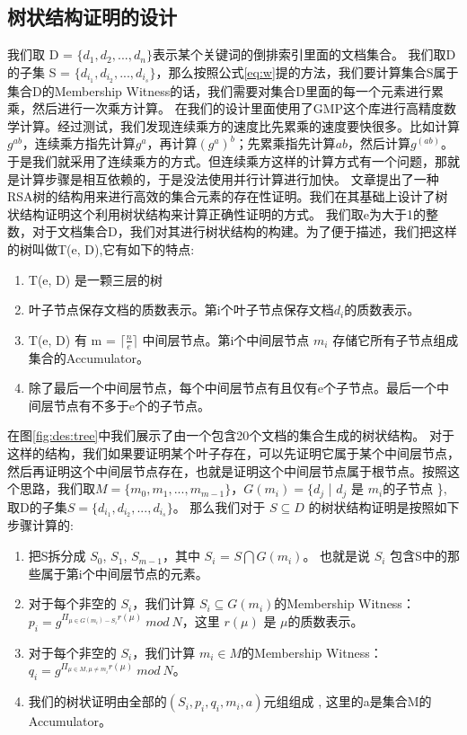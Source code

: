 \subsection{树状结构证明的设计}

我们取 D = $\{d_1, d_2, ..., d_n\}$表示某个关键词的倒排索引里面的文档集合。
我们取D的子集 S = $\{d_{i_1}, d_{i_2}, ..., d_{i_s}\}$，那么按照公式\ref{eq:w}提的方法，我们要计算集合S属于集合D的Membership Witness的话，我们需要对集合D里面的每一个元素进行累乘，然后进行一次乘方计算。
在我们的设计里面使用了GMP这个库进行高精度数学计算。经过测试，我们发现连续乘方的速度比先累乘的速度要快很多。比如计算$g^{ab}$，连续乘方指先计算$g^a$，再计算$(g^a)^b$；先累乘指先计算$ab$，然后计算$g^{(ab)}$。于是我们就采用了连续乘方的方式。但连续乘方这样的计算方式有一个问题，那就是计算步骤是相互依赖的，于是没法使用并行计算进行加快。
文章\cite{papamanthou2008authenticated}提出了一种RSA树的结构用来进行高效的集合元素的存在性证明。我们在其基础上设计了树状结构证明这个利用树状结构来计算正确性证明的方式。
我们取e为大于1的整数，对于文档集合D，我们对其进行树状结构的构建。为了便于描述，我们把这样的树叫做T(e, D),它有如下的特点:
\begin{enumerate}
  \item T(e, D) 是一颗三层的树
  \item 叶子节点保存文档的质数表示。第i个叶子节点保存文档$d_i$的质数表示。
  \item T(e, D) 有 m = $\lceil \frac{n}{e} \rceil$ 中间层节点。第i个中间层节点 $m_i$ 存储它所有子节点组成集合的Accumulator。
  \item 除了最后一个中间层节点，每个中间层节点有且仅有e个子节点。最后一个中间层节点有不多于e个的子节点。
\end{enumerate}

在图\ref{fig:des:tree}中我们展示了由一个包含20个文档的集合生成的树状结构。
对于这样的结构，我们如果要证明某个叶子存在，可以先证明它属于某个中间层节点，然后再证明这个中间层节点存在，也就是证明这个中间层节点属于根节点。按照这个思路，我们取$M = \{m_0, m_1, ..., m_{m-1}\}$，$G(m_i) = \{d_j$ | $d_j$ 是 $m_i$的子节点 \}, 取D的子集$S = \{d_{i_1}, d_{i_2}, ..., d_{i_s}\}$。 那么我们对于 $S \subseteq D$ 的树状结构证明是按照如下步骤计算的:
\begin{enumerate}
  \item 把S拆分成 $S_0$, $S_1$, $S_{m-1}$，其中 $S_i$ = $S \bigcap G(m_i)$。 也就是说 $S_i$ 包含S中的那些属于第i个中间层节点的元素。
  \item 对于每个非空的 $S_i$，我们计算 $S_i \subseteq G(m_i)$的Membership Witness：$p_i = g^{\Pi_{\mu \in G(m_i) - S_i} r(\mu)}\ mod\ N$，这里 $r(\mu)$ 是 $\mu$的质数表示。 
  \item 对于每个非空的 $S_i$，我们计算 $m_i \in M$的Membership Witness：$q_i =  g^{\Pi_{\mu \in M, \mu \ne m_i} r(\mu)}\ mod\ N$。
  \item 我们的树状证明由全部的$(S_i, p_i, q_i, m_i, a)$元组组成 , 这里的a是集合M的Accumulator。
\end{enumerate}

